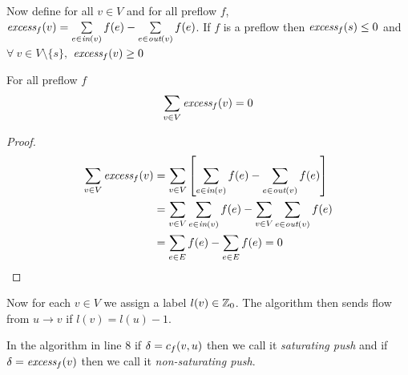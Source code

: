 Now define for all $v\in V$ and for all preflow $f$, $\emph{excess}_f(v)=\sum\limits_{e\in\emph{in}(v)}f(e)-\sum\limits_{e\in\emph{out}(v)}f(e)$. If $f$ is a preflow then $\emph{excess}_f(s)\leq 0$ and $\forall\ v\in V\setminus\{s\},$ $\emph{excess}_f(v)\geq 0$
\begin{lemma}{}{}
	For all preflow $f$ $$\sum\limits_{v\in V}\emph{excess}_f(v)=0$$
\end{lemma}
\begin{proof}
	\begin{align*}
		\sum\limits_{v\in V}\emph{excess}_f(v) & = \sum\limits_{v\in V}\left[ \sum\limits_{e\in\emph{in}(v)}f(e)-\sum\limits_{e\in\emph{out}(v)}f(e)\right]            \\
		                                         & = \sum\limits_{v\in V}\sum\limits_{e\in\emph{in}(v)}f(e)-\sum\limits_{v\in V}\sum\limits_{e\in\emph{out}(v)}f(e) \\
		                                         & = \sum_{e\in E}f(e)-\sum_{e\in E}f(e)=0
	\end{align*}
\end{proof}
Now for each $v\in V$ we assign a label $l(v)\in\mathbb{Z}_0$. The algorithm then sends flow from $u\to v$ if $l(v)=l(u)-1$.
\begin{center}
\end{center}
\begin{algorithm}
	\DontPrintSemicolon
	\caption{}
\end{algorithm}
In the algorithm in line 8 if $\delta=c_f(v,u)$ then we call it \emph{saturating push} and if $\delta=\emph{excess}_f(v)$ then we call it \emph{non-saturating push}.


